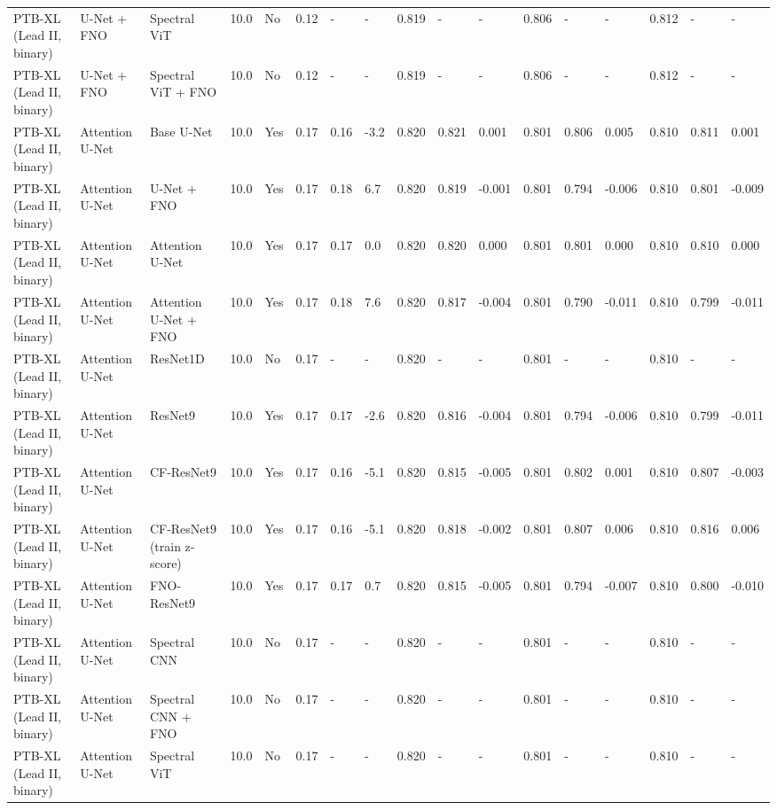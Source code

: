 \begin{longtable}{lllllllllllllllll}
PTB-XL (Lead II, binary) & U-Net + FNO & Spectral ViT & 10.0 & No & 0.12 & - & - & 0.819 & - & - & 0.806 & - & - & 0.812 & - & - \\
PTB-XL (Lead II, binary) & U-Net + FNO & Spectral ViT + FNO & 10.0 & No & 0.12 & - & - & 0.819 & - & - & 0.806 & - & - & 0.812 & - & - \\
PTB-XL (Lead II, binary) & Attention U-Net & Base U-Net & 10.0 & Yes & 0.17 & 0.16 & -3.2 & 0.820 & 0.821 & 0.001 & 0.801 & 0.806 & 0.005 & 0.810 & 0.811 & 0.001 \\
PTB-XL (Lead II, binary) & Attention U-Net & U-Net + FNO & 10.0 & Yes & 0.17 & 0.18 & 6.7 & 0.820 & 0.819 & -0.001 & 0.801 & 0.794 & -0.006 & 0.810 & 0.801 & -0.009 \\
PTB-XL (Lead II, binary) & Attention U-Net & Attention U-Net & 10.0 & Yes & 0.17 & 0.17 & 0.0 & 0.820 & 0.820 & 0.000 & 0.801 & 0.801 & 0.000 & 0.810 & 0.810 & 0.000 \\
PTB-XL (Lead II, binary) & Attention U-Net & Attention U-Net + FNO & 10.0 & Yes & 0.17 & 0.18 & 7.6 & 0.820 & 0.817 & -0.004 & 0.801 & 0.790 & -0.011 & 0.810 & 0.799 & -0.011 \\
PTB-XL (Lead II, binary) & Attention U-Net & ResNet1D & 10.0 & No & 0.17 & - & - & 0.820 & - & - & 0.801 & - & - & 0.810 & - & - \\
PTB-XL (Lead II, binary) & Attention U-Net & ResNet9 & 10.0 & Yes & 0.17 & 0.17 & -2.6 & 0.820 & 0.816 & -0.004 & 0.801 & 0.794 & -0.006 & 0.810 & 0.799 & -0.011 \\
PTB-XL (Lead II, binary) & Attention U-Net & CF-ResNet9 & 10.0 & Yes & 0.17 & 0.16 & -5.1 & 0.820 & 0.815 & -0.005 & 0.801 & 0.802 & 0.001 & 0.810 & 0.807 & -0.003 \\
PTB-XL (Lead II, binary) & Attention U-Net & CF-ResNet9 (train z-score) & 10.0 & Yes & 0.17 & 0.16 & -5.1 & 0.820 & 0.818 & -0.002 & 0.801 & 0.807 & 0.006 & 0.810 & 0.816 & 0.006 \\
PTB-XL (Lead II, binary) & Attention U-Net & FNO-ResNet9 & 10.0 & Yes & 0.17 & 0.17 & 0.7 & 0.820 & 0.815 & -0.005 & 0.801 & 0.794 & -0.007 & 0.810 & 0.800 & -0.010 \\
PTB-XL (Lead II, binary) & Attention U-Net & Spectral CNN & 10.0 & No & 0.17 & - & - & 0.820 & - & - & 0.801 & - & - & 0.810 & - & - \\
PTB-XL (Lead II, binary) & Attention U-Net & Spectral CNN + FNO & 10.0 & No & 0.17 & - & - & 0.820 & - & - & 0.801 & - & - & 0.810 & - & - \\
PTB-XL (Lead II, binary) & Attention U-Net & Spectral ViT & 10.0 & No & 0.17 & - & - & 0.820 & - & - & 0.801 & - & - & 0.810 & - & - \\

\end{longtable}
